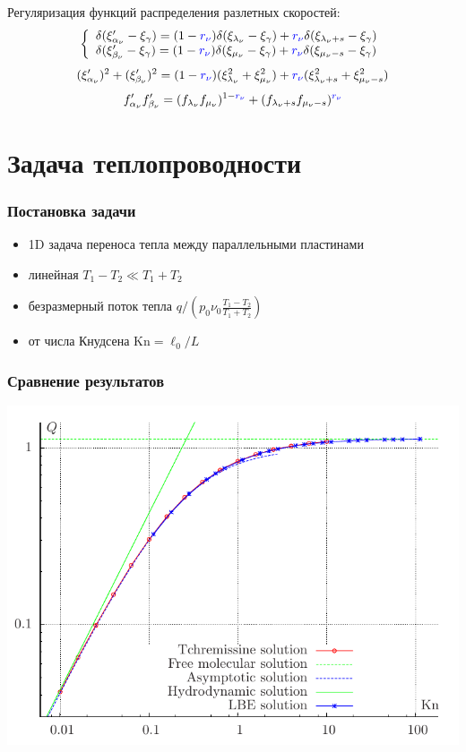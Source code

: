 \documentclass[ucs]{beamer}
\begin{document}
\begin{frame}
\begin{columns}
	\end{columns}
	Регуляризация функций распределения разлетных скоростей:
	\[\left\{ \begin{array}{l l}
		\delta(\xi_{\alpha_\nu}'-\xi_\gamma) = (1-{\color{blue}r_\nu}) \delta(\xi_{\lambda_\nu} - \xi_\gamma) + {\color{blue}r_\nu} \delta(\xi_{\lambda_\nu+s} - \xi_\gamma)  \\
		\delta(\xi_{\beta_\nu}'-\xi_\gamma) = (1-{\color{blue}r_\nu}) \delta(\xi_{\mu_\nu} - \xi_\gamma) + {\color{blue}r_\nu} \delta(\xi_{\mu_\nu-s} - \xi_\gamma)  \\
	\end{array}\right. \]
	\[(\xi_{\alpha_\nu}') ^ 2 + (\xi_{\beta_\nu}') ^2 = (1 - {\color{blue}r_\nu}) (\xi_{\lambda_\nu} ^ 2 + \xi_{\mu_\nu} ^2) +
	{\color{blue}r_\nu} (\xi_{\lambda_\nu+s} ^ 2 + \xi_{\mu_\nu-s} ^2)\]
	\[f_{\alpha_\nu}' f_{\beta_\nu}' = (f_{\lambda_\nu} f_{\mu_\nu})^{1 - {\color{blue}r_\nu}} + (f_{\lambda_\nu+s} f_{\mu_\nu-s})^{{\color{blue}r_\nu}}\]
\end{frame}

\section{Задача теплопроводности}
\begin{frame}
	\frametitle{Постановка задачи}
	\begin{itemize}
		\item 1D задача переноса тепла между параллельными пластинами \\
		\item линейная \(T_1-T_2 \ll T_1+T_2\) \\
		\item безразмерный поток тепла \(q/(p_0\nu_0 \frac{T_1-T_2}{T_1+T_2})\) \\
		\item от числа Кнудсена \(\mathrm{Kn} = \ell_0/L\) \\
	\end{itemize}
\end{frame}

\begin{frame}
	\frametitle{Сравнение результатов}
	\begin{center}
		\includegraphics[width=.9\textwidth]{pics/heat.pdf}
	\end{center}
\end{frame}
\end{document}
